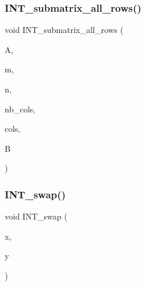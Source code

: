 \mbox{\label{util_8_c_ae4c416440fc7b7e1f9741ca235d5d694}} 
\subsubsection{\texorpdfstring{I\+N\+T\+\_\+submatrix\+\_\+all\+\_\+rows()}{INT\_submatrix\_all\_rows()}}
{\footnotesize\ttfamily void I\+N\+T\+\_\+submatrix\+\_\+all\+\_\+rows (\begin{DoxyParamCaption}\item[{\mbox{\hyperlink{galois_8h_a09fddde158a3a20bd2dcadb609de11dc}{I\+NT}} $\ast$}]{A,  }\item[{\mbox{\hyperlink{galois_8h_a09fddde158a3a20bd2dcadb609de11dc}{I\+NT}}}]{m,  }\item[{\mbox{\hyperlink{galois_8h_a09fddde158a3a20bd2dcadb609de11dc}{I\+NT}}}]{n,  }\item[{\mbox{\hyperlink{galois_8h_a09fddde158a3a20bd2dcadb609de11dc}{I\+NT}}}]{nb\+\_\+cols,  }\item[{\mbox{\hyperlink{galois_8h_a09fddde158a3a20bd2dcadb609de11dc}{I\+NT}} $\ast$}]{cols,  }\item[{\mbox{\hyperlink{galois_8h_a09fddde158a3a20bd2dcadb609de11dc}{I\+NT}} $\ast$}]{B }\end{DoxyParamCaption})}

\mbox{\label{util_8_c_a2ffd557a40a6f134ebd1031a586d364d}} 
\subsubsection{\texorpdfstring{I\+N\+T\+\_\+swap()}{INT\_swap()}}
{\footnotesize\ttfamily void I\+N\+T\+\_\+swap (\begin{DoxyParamCaption}\item[{\mbox{\hyperlink{galois_8h_a09fddde158a3a20bd2dcadb609de11dc}{I\+NT}} \&}]{x,  }\item[{\mbox{\hyperlink{galois_8h_a09fddde158a3a20bd2dcadb609de11dc}{I\+NT}} \&}]{y }\end{DoxyParamCaption})}

\mbox{\label{util_8_c_abdc7f1105bbaef14bcbf1b5095f687c9}} 

